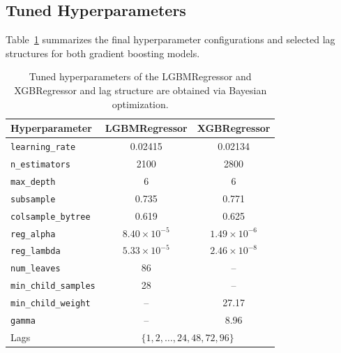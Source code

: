 \subsection{Tuned Hyperparameters}
\label{app:hyperparameters}
Table~\ref{tab:hyperparams} summarizes the final hyperparameter configurations and selected lag structures for both gradient boosting models.
\begin{table}[H]
    \centering
    \caption{Tuned hyperparameters of the LGBMRegressor and XGBRegressor and lag structure are obtained via Bayesian optimization.}
    \label{tab:hyperparams}
    \scriptsize
    \begin{tabular}{lcc}
        \toprule
        \textbf{Hyperparameter} & \textbf{LGBMRegressor} & \textbf{XGBRegressor} \\
        \midrule
        \texttt{learning\_rate} & 0.02415 & 0.02134 \\
        \texttt{n\_estimators} & 2100 & 2800 \\
        \texttt{max\_depth} & 6 & 6 \\
        \texttt{subsample} & 0.735 & 0.771 \\
        \texttt{colsample\_bytree} & 0.619 & 0.625 \\
        \texttt{reg\_alpha} & $8.40 \times 10^{-5}$ & $1.49 \times 10^{-6}$ \\
        \texttt{reg\_lambda} & $5.33 \times 10^{-5}$ & $2.46 \times 10^{-8}$ \\
        \midrule
        \texttt{num\_leaves} & 86 & -- \\
        \texttt{min\_child\_samples} & 28 & -- \\
        \texttt{min\_child\_weight} & -- & 27.17 \\
        \texttt{gamma} & -- & 8.96 \\
        \midrule
        Lags & \multicolumn{2}{c}{$\{1, 2, \dots, 24, 48, 72, 96\}$} \\
        \bottomrule
    \end{tabular}
\end{table}